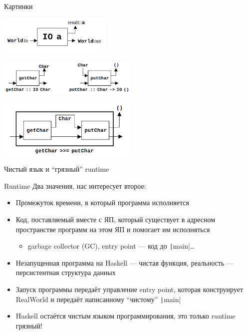     \begin{frame}[fragile]{Картинки}
        \vspace{-0.5em}
        \pause
        \begin{center}
            \includegraphics[width=0.4\textwidth]{figs/io1}

            \includegraphics[width=0.5\textwidth]{figs/io2}

            \includegraphics[width=0.5\textwidth]{figs/io3}
        \end{center}
    \end{frame}

    \begin{frame}[fragile]{Чистый язык и ``грязный'' runtime \popslide}
        \vspace{-0.5em}
        \pause
        \begin{block}{Runtime}
            Два значения, нас интересует второе:
            \begin{itemize}
                \item[\defi] Промежуток времени, в который программа исполняется
                \item[\defi] Код, поставляемый вместе с ЯП, который существует в адресном пространстве программ на этом ЯП и помогает им исполняться
                \begin{itemize}
                    \item[\eg] garbage collector (GC), entry point --- код до \texttt|main|\ldots
                \end{itemize}
            \end{itemize}
        \end{block}
        \begin{itemize}
            \item Незапущенная программа на Haskell --- чистая функция, реальность --- персистентная структура данных
            \item Запуск программы передаёт управление entry point, которая конструирует RealWorld и передаёт написанному ``чистому'' \texttt|main|
            \item Haskell остаётся чистым языком программирования, это только runtime грязный!
        \end{itemize}
    \end{frame}

